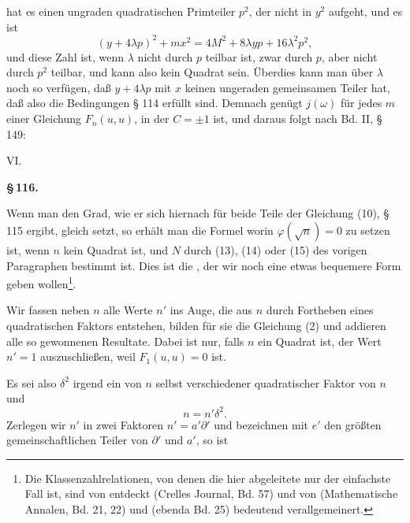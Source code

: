 hat es einen ungraden quadratischen Primteiler $p^2$, der nicht in $y^2$
aufgeht, und es ist
\[
(y+4\lambda p)^2 + m x^2 = 4M^2 + 8\lambda y p + 16\lambda^2 p^2,
\]
und diese Zahl ist, wenn $\lambda$ nicht durch $p$ teilbar ist, zwar durch
$p$, aber nicht durch $p^2$ teilbar, und kann also kein Quadrat sein.
Überdies kann man über $\lambda$ noch so verfügen, daß $y+4\lambda p$ mit
$x$ keinen ungeraden gemeinsamen Teiler hat, daß also die Bedingungen
§ 114 erfüllt sind. Demnach genügt $j(\omega)$ für jedes $m$ einer
Gleichung $F_n(u,u)$, in der $C=\pm 1$ ist, und daraus folgt nach Bd. II,
§ 149:

VI.  %

\begin{center}
\textbf{\S\,116. }
\end{center}

Wenn man den Grad, wie er sich hiernach für beide Teile der Gleichung
(10), § 115 ergibt, gleich setzt, so erhält man die Formel
worin $\varphi(\sqrt{n})=0$ zu setzen ist, wenn $n$ kein Quadrat ist, und
$N$ durch (13), (14) oder (15) des vorigen Paragraphen bestimmt ist.
Dies ist die , der wir noch eine etwas
bequemere Form geben wollen\footnote{Die Klassenzahlrelationen, von
denen die hier abgeleitete nur der einfachste Fall ist, sind von
 entdeckt (Crelles Journal, Bd. 57) und von
 (Mathematische Annalen, Bd. 21, 22) und
 (ebenda Bd. 25) bedeutend verallgemeinert.}.

Wir fassen neben $n$ alle Werte $n'$ ins Auge, die aus $n$ durch
Fortheben eines quadratischen Faktors entstehen, bilden für sie die
Gleichung (2) und addieren alle so gewonnenen Resultate. Dabei ist nur,
falls $n$ ein Quadrat ist, der Wert $n'=1$ auszuschließen, weil
$F_1(u,u)=0$ ist.

Es sei also $\delta^2$ irgend ein von $n$ selbst verschiedener
quadratischer Faktor von $n$ und
\[
n = n'\delta^2.
\]
Zerlegen wir $n'$ in zwei Faktoren $n' = a'\partial'$ und bezeichnen mit
$e'$ den größten gemeinschaftlichen Teiler von $\partial'$ und $a'$, so
ist
